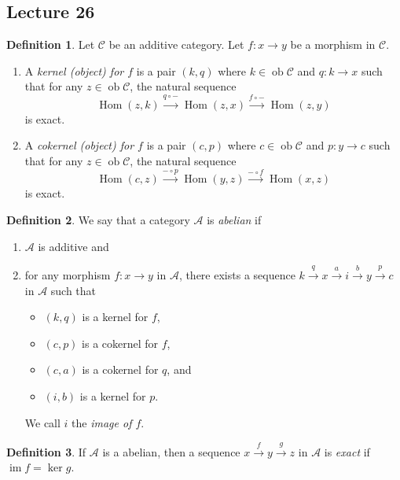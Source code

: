 \documentclass[10pt,letterpaper,cm]{nupset}
\theoremstyle{definition}
\newtheorem{definition}{Definition}[subsection]
\theoremstyle{theorem}
\theoremstyle{remark}
\newcommand{\1}{\mathbf{1}}
\renewcommand{\a}{\mathscr{A}}
\renewcommand{\c}{\mathscr{C}}
\newcommand{\0}{\vec 0}
\DeclareMathOperator{\im}{im}
\DeclareMathOperator{\ob}{ob}
\DeclareMathOperator{\Hom}{Hom}
\begin{document}
\subsection{Lecture 26}

\begin{definition}
Let $\c$ be an additive category. Let $f: x \to y$ be a morphism in $\c$. 
\begin{enumerate}
\item A \textit{kernel (object) for $f$} is a pair $(k, q)$ where $k \in \ob{\c}$ and $q : k \to x$ such that for any $z \in \ob{\c}$, the natural sequence $$ \Hom(z,k) \overset{q\circ {-}}{\longrightarrow} \Hom(z,x) \overset{f\circ {-}}{\longrightarrow} \Hom(z,y)   $$ is exact.
\item  A \textit{cokernel (object) for $f$} is a pair $(c, p)$ where $c \in \ob{\c}$ and $p : y \to c$ such that for any $z \in \ob{\c}$, the natural sequence $$ \Hom(c,z) \overset{{-}\circ p}{\longrightarrow} \Hom(y,z) \overset{{-}\circ f}{\longrightarrow} \Hom(x,z)   $$ is exact.
\end{enumerate}
\end{definition}

\begin{definition}
We say that a category $\a$ is \textit{abelian} if
\begin{enumerate}
\item $\a$ is additive and
\item for any morphism $f : x \to y$ in $\a$, there exists a sequence $k \overset{q}{\longrightarrow} x  \overset{a}{\longrightarrow} i \overset{b}{\longrightarrow}y \overset{p}{\longrightarrow} c$ in $\a$ such that
\begin{itemize}
\item $(k, q)$ is a kernel for $f$,
\item $(c, p)$ is a cokernel for $f$,
\item $(c, a)$ is a cokernel for $q$, and
\item $(i,b)$ is a kernel for $p$.
\end{itemize}
We call $i$ the \textit{image of $f$}.
\end{enumerate}
\end{definition}

\begin{definition}
If $\a$ is a abelian, then a sequence $x \overset{f}{\longrightarrow} y \overset{g}{\longrightarrow} z$ in $\a$ is \textit{exact} if $\im{f} = \ker{g}$.
\end{definition}
\end{document}
